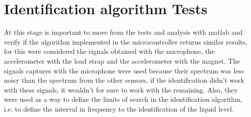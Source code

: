 \section{Identification algorithm Tests}
At this stage is important to move from the tests and analysis with \acrshort{matlab} and verify if the algorithm implemented in the microcontroller returns similar results, for this were considered the signals obtained with the microphone, the accelerometer with the load strap and the accelerometer with the magnet. The signals captures with the microphone were used because their spectrum was less noisy than the spectrum from the other sensors, if the identification didn't work with these signals, it wouldn't for sure to work with the remaining. Also, they were used as a way to define the limits of search in the identification algorithm, i.e. to define the interval in frequency to the identification of the liquid level.  



\clearpage
